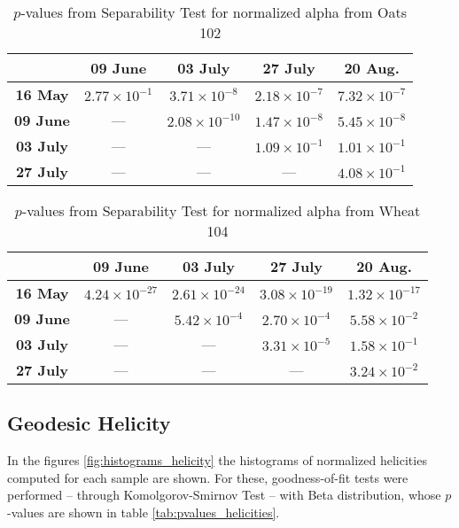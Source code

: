 \documentclass[journal]{IEEEtran}
\begin{document}
\begin{table}[hbt]
  \footnotesize
  \centering
  \caption{$p$-values from Separability Test for normalized alpha from Oats 102}
  \label{tab:pvalues_sep_alpha_ot102}
  \begin{tabular}{ccccc}
  \toprule
  & \textbf{09 June} & \textbf{03 July} & \textbf{27 July} & \textbf{20 Aug.}\\ \midrule
  \textbf{16 May}  & $2.77 \times 10^{-1}$ & $3.71 \times 10^{-8}$ & $2.18 \times 10^{-7}$ & $7.32 \times 10^{-7}$ \\
  \textbf{09 June}  & --- & $2.08 \times 10^{-10}$ & $1.47 \times 10^{-8}$ & $5.45 \times 10^{-8}$ \\
  \textbf{03 July}  & --- & --- & $1.09 \times 10^{-1}$ & $1.01 \times 10^{-1}$\\
  \textbf{27 July}  & --- & --- & --- & $4.08 \times 10^{-1}$ \\
  \bottomrule
  \end{tabular}
\end{table}

\begin{table}[hbt]
  \footnotesize
  \centering
  \caption{$p$-values from Separability Test for normalized alpha from Wheat 104}
  \label{tab:pvalues_sep_alpha_wt104}
  \begin{tabular}{ccccc}
  \toprule
  & \textbf{09 June} & \textbf{03 July} & \textbf{27 July} & \textbf{20 Aug.}\\ \midrule
  \textbf{16 May}  & $4.24 \times 10^{-27}$ & $2.61 \times 10^{-24}$ & $3.08 \times 10^{-19}$ & $1.32 \times 10^{-17}$ \\
  \textbf{09 June}  & --- & $5.42 \times 10^{-4}$ & $2.70 \times 10^{-4}$ & $5.58 \times 10^{-2}$ \\
  \textbf{03 July}  & --- & --- & $3.31 \times 10^{-5}$ & $1.58 \times 10^{-1}$\\
  \textbf{27 July}  & --- & --- & --- & $3.24 \times 10^{-2}$ \\
  \bottomrule
  \end{tabular}
\end{table}

\subsection{Geodesic Helicity}

In the figures \ref{fig:histograms_helicity} the histograms of normalized helicities computed for each sample are shown. For these, goodness-of-fit tests were performed -- through Komolgorov-Smirnov Test -- with Beta distribution, whose $p$-values are shown in table \ref{tab:pvalues_helicities}.
\end{document}
